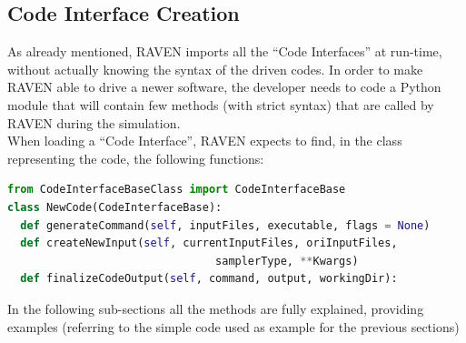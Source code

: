 \subsection{Code Interface Creation} 
\label{subsec:codeinterfacecreation}
As already mentioned, RAVEN imports all the ``Code Interfaces'' at run-time, 
without actually knowing the syntax of the driven codes. In order to make RAVEN
able to drive a newer software, the developer needs to code a Python module 
that will contain few methods (with strict syntax) that are called by RAVEN during the simulation.
\\ When loading a ``Code Interface'', RAVEN expects to find, in the class representing the code,
 the following functions:
\begin{lstlisting}[language=python]
from CodeInterfaceBaseClass import CodeInterfaceBase
class NewCode(CodeInterfaceBase):
  def generateCommand(self, inputFiles, executable, flags = None)
  def createNewInput(self, currentInputFiles, oriInputFiles,
                                samplerType, **Kwargs)                           
  def finalizeCodeOutput(self, command, output, workingDir):
\end{lstlisting} 
In the following sub-sections all the methods are fully explained, providing examples
 (referring to the simple code used as example for the previous sections)
